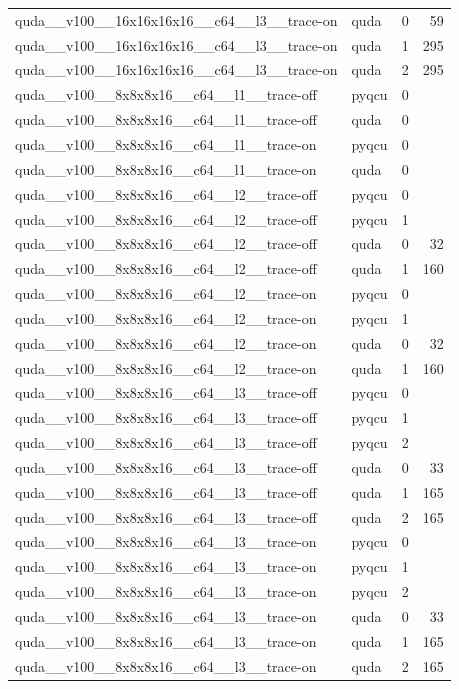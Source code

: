 \begin{table}[htbp]
\begin{tabular}{@{}llrr@{}}
quda\_\_v100\_\_16x16x16x16\_\_c64\_\_l3\_\_trace-on & quda & 0 & 59 \\
quda\_\_v100\_\_16x16x16x16\_\_c64\_\_l3\_\_trace-on & quda & 1 & 295 \\
quda\_\_v100\_\_16x16x16x16\_\_c64\_\_l3\_\_trace-on & quda & 2 & 295 \\
quda\_\_v100\_\_8x8x8x16\_\_c64\_\_l1\_\_trace-off & pyqcu & 0 &  \\
quda\_\_v100\_\_8x8x8x16\_\_c64\_\_l1\_\_trace-off & quda & 0 &  \\
quda\_\_v100\_\_8x8x8x16\_\_c64\_\_l1\_\_trace-on & pyqcu & 0 &  \\
quda\_\_v100\_\_8x8x8x16\_\_c64\_\_l1\_\_trace-on & quda & 0 &  \\
quda\_\_v100\_\_8x8x8x16\_\_c64\_\_l2\_\_trace-off & pyqcu & 0 &  \\
quda\_\_v100\_\_8x8x8x16\_\_c64\_\_l2\_\_trace-off & pyqcu & 1 &  \\
quda\_\_v100\_\_8x8x8x16\_\_c64\_\_l2\_\_trace-off & quda & 0 & 32 \\
quda\_\_v100\_\_8x8x8x16\_\_c64\_\_l2\_\_trace-off & quda & 1 & 160 \\
quda\_\_v100\_\_8x8x8x16\_\_c64\_\_l2\_\_trace-on & pyqcu & 0 &  \\
quda\_\_v100\_\_8x8x8x16\_\_c64\_\_l2\_\_trace-on & pyqcu & 1 &  \\
quda\_\_v100\_\_8x8x8x16\_\_c64\_\_l2\_\_trace-on & quda & 0 & 32 \\
quda\_\_v100\_\_8x8x8x16\_\_c64\_\_l2\_\_trace-on & quda & 1 & 160 \\
quda\_\_v100\_\_8x8x8x16\_\_c64\_\_l3\_\_trace-off & pyqcu & 0 &  \\
quda\_\_v100\_\_8x8x8x16\_\_c64\_\_l3\_\_trace-off & pyqcu & 1 &  \\
quda\_\_v100\_\_8x8x8x16\_\_c64\_\_l3\_\_trace-off & pyqcu & 2 &  \\
quda\_\_v100\_\_8x8x8x16\_\_c64\_\_l3\_\_trace-off & quda & 0 & 33 \\
quda\_\_v100\_\_8x8x8x16\_\_c64\_\_l3\_\_trace-off & quda & 1 & 165 \\
quda\_\_v100\_\_8x8x8x16\_\_c64\_\_l3\_\_trace-off & quda & 2 & 165 \\
quda\_\_v100\_\_8x8x8x16\_\_c64\_\_l3\_\_trace-on & pyqcu & 0 &  \\
quda\_\_v100\_\_8x8x8x16\_\_c64\_\_l3\_\_trace-on & pyqcu & 1 &  \\
quda\_\_v100\_\_8x8x8x16\_\_c64\_\_l3\_\_trace-on & pyqcu & 2 &  \\
quda\_\_v100\_\_8x8x8x16\_\_c64\_\_l3\_\_trace-on & quda & 0 & 33 \\
quda\_\_v100\_\_8x8x8x16\_\_c64\_\_l3\_\_trace-on & quda & 1 & 165 \\
quda\_\_v100\_\_8x8x8x16\_\_c64\_\_l3\_\_trace-on & quda & 2 & 165 \\
\bottomrule
\end{tabular}
\end{table}

